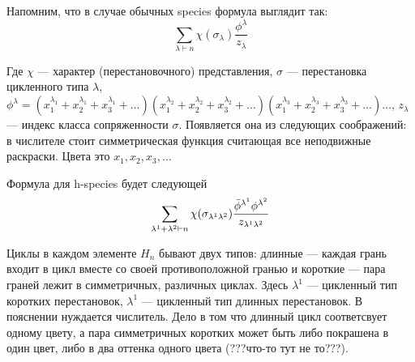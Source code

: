 Напомним, что в случае обычных species формула выглядит так:
\begin{equation}
\label{eq:fr}
\sum_{\lambda \vdash n}\chi(\sigma_{\lambda}) \frac{\phi^{\lambda}}{z_{\lambda}}
\end{equation}

Где $\chi$ --- характер (перестановочного) представления, $\sigma$ ---
перестановка цикленного типа $\lambda$, 
$\phi^{\lambda} = 
(x_1^{\lambda_1} + x_2^{\lambda_1} + x_3^{\lambda_1} + \dots)
(x_1^{\lambda_2} + x_2^{\lambda_2} + x_3^{\lambda_2} + \dots)
(x_1^{\lambda_3} + x_2^{\lambda_3} + x_3^{\lambda_3} + \dots)
\dots$,
 $z_\lambda$ --- индекс класса сопряженности $\sigma$.
Появляется она из следующих соображений: в числителе стоит симметрическая
функция считающая все неподвижные раскраски. Цвета это $x_1, x_2, x_3, \dots$

Формула для h-species будет следующей
\begin{equation}
\label{eq:h-fr}
\sum_{\lambda^1 + \lambda^2 \vdash n}\chi(\sigma_{\lambda^1 \lambda^2})
\frac{\Bar{\phi}^{\lambda^1} \phi^{\lambda^2}}{z_{\lambda^1 \lambda^2}}
\end{equation}

Циклы в каждом элементе $H_n$ бывают двух типов:
длинные --- каждая грань входит в цикл вместе со своей противоположной гранью и
короткие --- пара граней лежит в симметричных, различных циклах. Здесь
$\lambda^1$ --- цикленный тип коротких перестановок, $\lambda^1$ --- цикленный тип длинных перестановок.
В пояснении нуждается числитель. Дело в том что длинный цикл соответсвует
одному цвету, а пара симметричных коротких может быть либо покрашена в один
цвет, либо в два оттенка одного цвета (???что-то тут не то???).

